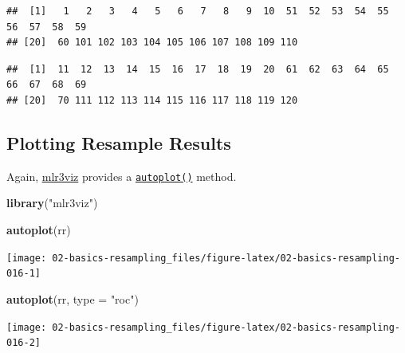 \documentclass[]{scrbook}
\newenvironment{Shaded}{\begin{snugshade}}{\end{snugshade}}
\newcommand{\DataTypeTok}[1]{\textcolor[rgb]{0.13,0.29,0.53}{#1}}
\newcommand{\DecValTok}[1]{\textcolor[rgb]{0.00,0.00,0.81}{#1}}
\newcommand{\KeywordTok}[1]{\textcolor[rgb]{0.13,0.29,0.53}{\textbf{#1}}}
\newcommand{\NormalTok}[1]{#1}
\newcommand{\OperatorTok}[1]{\textcolor[rgb]{0.81,0.36,0.00}{\textbf{#1}}}
\newcommand{\StringTok}[1]{\textcolor[rgb]{0.31,0.60,0.02}{#1}}
\renewenvironment{Shaded} {\begin{snugshade}\small} {\end{snugshade}}
\begin{document}
\begin{verbatim}
##  [1]   1   2   3   4   5   6   7   8   9  10  51  52  53  54  55  56  57  58  59
## [20]  60 101 102 103 104 105 106 107 108 109 110
\end{verbatim}

\begin{Shaded}
\end{Shaded}

\begin{verbatim}
##  [1]  11  12  13  14  15  16  17  18  19  20  61  62  63  64  65  66  67  68  69
## [20]  70 111 112 113 114 115 116 117 118 119 120
\end{verbatim}

\hypertarget{autoplot-resampleresult}{%
\subsection{Plotting Resample Results}\label{autoplot-resampleresult}}

Again, \href{https://mlr3viz.mlr-org.com}{mlr3viz} provides a \href{https://www.rdocumentation.org/packages/ggplot2/topics/autoplot}{\texttt{autoplot()}} method.

\begin{Shaded}
\begin{Highlighting}[]
\KeywordTok{library}\NormalTok{(}\StringTok{"mlr3viz"}\NormalTok{)}

\KeywordTok{autoplot}\NormalTok{(rr)}
\end{Highlighting}
\end{Shaded}

\begin{center}\texttt{[image: 02-basics-resampling\_files/figure-latex/02-basics-resampling-016-1]} \end{center}

\begin{Shaded}
\begin{Highlighting}[]
\KeywordTok{autoplot}\NormalTok{(rr, }\DataTypeTok{type =} \StringTok{"roc"}\NormalTok{)}
\end{Highlighting}
\end{Shaded}

\begin{center}\texttt{[image: 02-basics-resampling\_files/figure-latex/02-basics-resampling-016-2]} \end{center}
\end{document}
